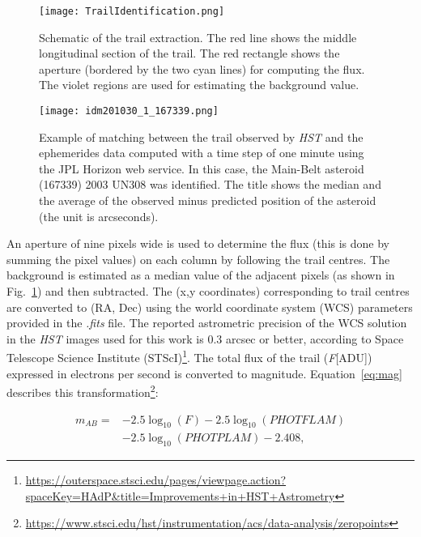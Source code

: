 \documentclass{aa}
\begin{document}
\begin{figure}
   \centering
   \texttt{[image: TrailIdentification.png]}
   \caption{Schematic of the trail extraction. The red line shows the middle longitudinal section of the trail. The red rectangle shows the aperture (bordered by the two cyan lines) for computing the flux. The violet regions are used for estimating the background value.}
    \label{TrailIdent}%
\end{figure}


\begin{figure}
   \centering
   \texttt{[image: idm201030\_1\_167339.png]}
   \caption{Example of matching between the trail observed by \textit{HST} and the ephemerides data computed with a time step of one minute using the JPL Horizon web service. In this case, the Main-Belt asteroid (167339) 2003 UN308 was identified. The title shows the median and the average of the observed minus predicted position of the asteroid (the unit is arcseconds).}
    \label{TrailMatch}%
\end{figure}

An aperture of nine pixels wide is used to determine the flux (this is done by summing the pixel values) on each column by following the trail centres. The background is estimated as a median value of the adjacent pixels (as shown in Fig.~\ref{TrailIdent}) and then subtracted. The (x,y coordinates) corresponding to trail centres are converted to (RA, Dec) using the world coordinate system (WCS) parameters provided in the \emph{.fits} file. The reported astrometric precision of the WCS solution in the {\it HST} images used for this work is 0.3 arcsec or better, according to Space Telescope Science Institute (STScI)\footnote{\url{https://outerspace.stsci.edu/pages/viewpage.action?spaceKey=HAdP&title=Improvements+in+HST+Astrometry}}. The total flux of the trail (\emph{F}[ADU]) expressed in electrons per second is converted to magnitude. Equation~\ref{eq:mag} describes this transformation\footnote{\url{https://www.stsci.edu/hst/instrumentation/acs/data-analysis/zeropoints}}: 

\begin{equation}
\begin{aligned}
m_{AB} = & -2.5\log_{10}(F) -2.5\log_{10}(PHOTFLAM) \\
         & - 2.5\log_{10}(PHOTPLAM) - 2.408,
\end{aligned}
\label{eq:mag}
\end{equation}

\end{document}
